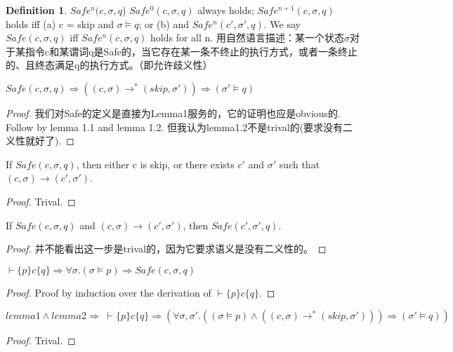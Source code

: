 \documentclass{ctexart}
\theoremstyle{definition}
\newtheorem{definition}{Definition}[section]
\newenvironment{lemma}[2][Lemma]{\begin{trivlist}
\item[\hskip \labelsep {\bfseries #1}\hskip \labelsep {\bfseries #2.}]}{\end{trivlist}}
\begin{document}
\begin{definition}{$Safe^n(c,\sigma,q$)}
    \newline $Safe^0(c,\sigma,q)$ always holds;
    \newline $Safe^{n+1}(c,\sigma,q)$ holds iff (a) c = skip and $\sigma \models q$; or (b) 
    \color{red}{there exists $c'$ and $\sigma'$ such that $(c, \sigma)\longrightarrow(c', \sigma')$} and $Safe^n(c',\sigma',q)$.
    \newline 
    \color{black} We say $Safe(c,\sigma,q)$ iff $Safe^n(c,\sigma,q)$ holds for all n.
    \newline 用自然语言描述：某一个状态$\sigma$对于某指令c和某谓词q是Safe的，当它存在某一条不终止的执行方式，或者一条终止的、且终态满足q的执行方式。（即允许歧义性）
\end{definition}


\begin{lemma}{1}
$Safe(c,\sigma,q) \Rightarrow ((c,\sigma)\longrightarrow^*(skip,\sigma'))\Rightarrow(\sigma'\models q)$
\end{lemma}


\begin{proof}
我们对Safe的定义是直接为Lemma1服务的，它的证明也应是obvious的. 
Follow by lemma 1.1 and lemma 1.2. 但我认为lemma1.2不是trival的(要求没有二义性就好了).
\end{proof}

\begin{lemma}{1.1 Progress}
    If $Safe(c,\sigma,q)$, then either c is skip, or there exists $c'$ and $\sigma'$ such that 
    $(c, \sigma)\longrightarrow(c', \sigma')$. 
\end{lemma}

\begin{proof}
    Trival.
\end{proof}


\begin{lemma}{1.2 Preservation} 
    If $Safe(c,\sigma,q)$ and $(c,\sigma)\longrightarrow(c', \sigma')$, then 
    $Safe(c', \sigma', q)$.
\end{lemma}
\begin{proof}
    并不能看出这一步是trival的，因为它要求语义是没有二义性的。
\end{proof}

\begin{lemma}{2}
    $\vdash\{p\}c\{q\} \Rightarrow \forall\sigma.(\sigma\models p)\Rightarrow Safe(c,\sigma,q)$
\end{lemma}

\begin{proof}
    Proof by induction over the derivation of $\vdash\{p\}c\{q\}$.
\end{proof}

\begin{lemma}{3. Lead to Soundness}
    $lemma1 \wedge lemma2 \Rightarrow\;\vdash\{p\}c\{q\} \Rightarrow ( \forall \sigma,\sigma'.((\sigma\models p)\wedge((c,\sigma)\longrightarrow^*(skip, \sigma')))\Rightarrow(\sigma'\models q))$
\end{lemma}

\begin{proof}
    Trival.
\end{proof}
\end{document}
